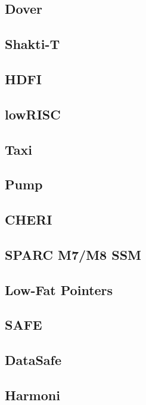 \subsection{Dover}

\subsection{Shakti-T}

\subsection{HDFI}

\subsection{lowRISC}

\subsection{Taxi}

\subsection{Pump}

\subsection{CHERI}

\subsection{SPARC M7/M8 SSM}

\subsection{Low-Fat Pointers}

\subsection{SAFE}

\subsection{DataSafe}

\subsection{Harmoni}

